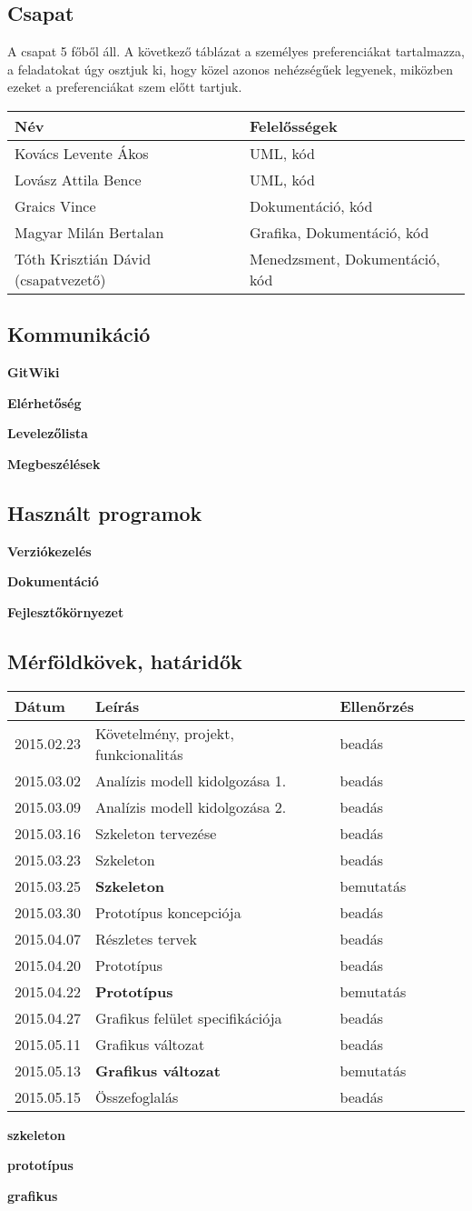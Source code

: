 \subsection{Csapat}
A csapat 5 főből áll. A következő táblázat a személyes preferenciákat tartalmazza, a feladatokat úgy osztjuk ki, hogy közel azonos nehézségűek legyenek, miközben ezeket a preferenciákat szem előtt tartjuk.


\begin{longtable}{| l | l |}
\hline
\textbf{Név}   & \textbf{Felelősségek}  \tabularnewline
\hline
\hline Kovács Levente Ákos & UML, kód  \tabularnewline
\hline Lovász Attila Bence & UML, kód  \tabularnewline
\hline Graics Vince & Dokumentáció, kód  \tabularnewline
\hline Magyar Milán Bertalan & Grafika, Dokumentáció, kód  \tabularnewline
\hline Tóth Krisztián Dávid (csapatvezető) & Menedzsment, Dokumentáció, kód  \tabularnewline
\hline
\end{longtable}

\subsection {Kommunikáció}

\textbf{GitWiki}

\textbf{Elérhetőség}

\textbf{Levelezőlista}

\textbf{Megbeszélések}


\subsection{Használt programok}

\textbf{Verziókezelés}

\textbf{Dokumentáció}

\textbf{Fejlesztőkörnyezet}


\subsection{Mérföldkövek, határidők}


\begin{longtable}{| l | l | l | l | l | l |}
\hline
\textbf{Dátum}   & \textbf{Leírás} & \textbf{Ellenőrzés} \tabularnewline
\hline
\hline 2015.02.23 & Követelmény, projekt, funkcionalitás & beadás  \tabularnewline
\hline 2015.03.02 & Analízis modell kidolgozása 1. & beadás  \tabularnewline
\hline 2015.03.09 & Analízis modell kidolgozása 2. & beadás  \tabularnewline
\hline 2015.03.16 & Szkeleton tervezése & beadás  \tabularnewline
\hline 2015.03.23 & Szkeleton & beadás  \tabularnewline
\hline 2015.03.25 & \textbf{Szkeleton} & bemutatás  \tabularnewline
\hline 2015.03.30 & Prototípus koncepciója & beadás  \tabularnewline
\hline 2015.04.07 & Részletes tervek & beadás  \tabularnewline
\hline 2015.04.20 & Prototípus & beadás  \tabularnewline
\hline 2015.04.22 & \textbf{Prototípus} & bemutatás  \tabularnewline
\hline 2015.04.27 & Grafikus felület specifikációja & beadás  \tabularnewline
\hline 2015.05.11 & Grafikus változat & beadás  \tabularnewline
\hline 2015.05.13 & \textbf{Grafikus változat} & bemutatás  \tabularnewline
\hline 2015.05.15 & Összefoglalás & beadás  \tabularnewline
\hline
\end{longtable}


\textbf{szkeleton}

\textbf{prototípus}

\textbf{grafikus}


